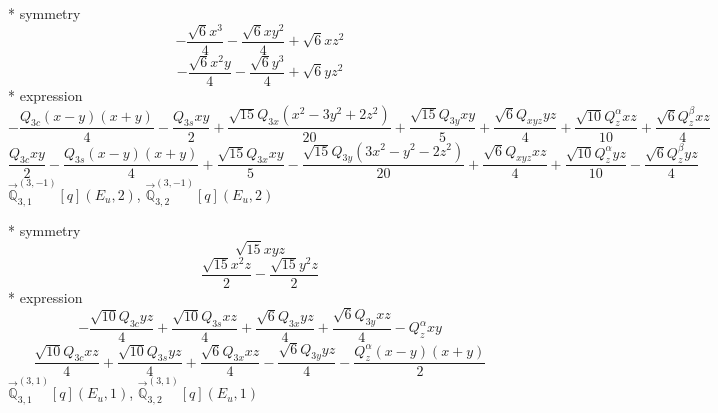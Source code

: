 \documentclass[fleqn,8pt]{jsarticle}
\begin{document}
\noindent\quad ** symmetry
\begin{dmath*}
- \frac{\sqrt{6} x^{3}}{4} - \frac{\sqrt{6} x y^{2}}{4} + \sqrt{6} x z^{2}
\end{dmath*}
\begin{dmath*}
- \frac{\sqrt{6} x^{2} y}{4} - \frac{\sqrt{6} y^{3}}{4} + \sqrt{6} y z^{2}
\end{dmath*}
\noindent\quad ** expression
\begin{dmath*}
- \frac{Q_{3c} \left(x - y\right) \left(x + y\right)}{4} - \frac{Q_{3s} x y}{2} + \frac{\sqrt{15} Q_{3x} \left(x^{2} - 3 y^{2} + 2 z^{2}\right)}{20} + \frac{\sqrt{15} Q_{3y} x y}{5} + \frac{\sqrt{6} Q_{xyz} y z}{4} + \frac{\sqrt{10} Q_{z}^{\alpha} x z}{10} + \frac{\sqrt{6} Q_{z}^{\beta} x z}{4}
\end{dmath*}
\begin{dmath*}
\frac{Q_{3c} x y}{2} - \frac{Q_{3s} \left(x - y\right) \left(x + y\right)}{4} + \frac{\sqrt{15} Q_{3x} x y}{5} - \frac{\sqrt{15} Q_{3y} \left(3 x^{2} - y^{2} - 2 z^{2}\right)}{20} + \frac{\sqrt{6} Q_{xyz} x z}{4} + \frac{\sqrt{10} Q_{z}^{\alpha} y z}{10} - \frac{\sqrt{6} Q_{z}^{\beta} y z}{4}
\end{dmath*}
\noindent\quad $\vec{\mathbb{Q}}_{3,1}^{(3,-1)}[q](E_{u},2)$, $\vec{\mathbb{Q}}_{3,2}^{(3,-1)}[q](E_{u},2)$

\noindent\quad ** symmetry
\begin{dmath*}
\sqrt{15} x y z
\end{dmath*}
\begin{dmath*}
\frac{\sqrt{15} x^{2} z}{2} - \frac{\sqrt{15} y^{2} z}{2}
\end{dmath*}
\noindent\quad ** expression
\begin{dmath*}
- \frac{\sqrt{10} Q_{3c} y z}{4} + \frac{\sqrt{10} Q_{3s} x z}{4} + \frac{\sqrt{6} Q_{3x} y z}{4} + \frac{\sqrt{6} Q_{3y} x z}{4} - Q_{z}^{\alpha} x y
\end{dmath*}
\begin{dmath*}
\frac{\sqrt{10} Q_{3c} x z}{4} + \frac{\sqrt{10} Q_{3s} y z}{4} + \frac{\sqrt{6} Q_{3x} x z}{4} - \frac{\sqrt{6} Q_{3y} y z}{4} - \frac{Q_{z}^{\alpha} \left(x - y\right) \left(x + y\right)}{2}
\end{dmath*}
\noindent\quad $\vec{\mathbb{Q}}_{3,1}^{(3,1)}[q](E_{u},1)$, $\vec{\mathbb{Q}}_{3,2}^{(3,1)}[q](E_{u},1)$
\end{document}

